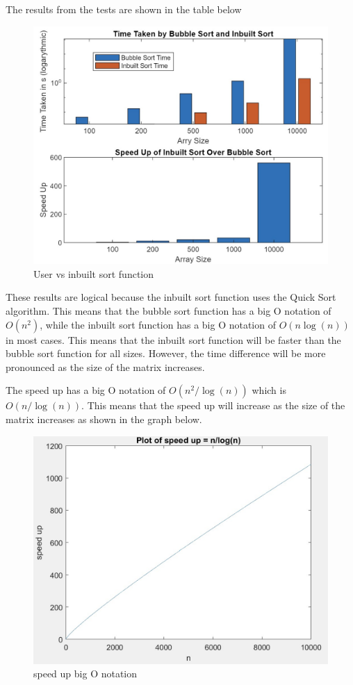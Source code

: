 The results from the tests are shown in the table below


\begin{figure}[H]
 \centering
 \includegraphics[width=0.6\columnwidth]{Figures/noPar}
 \caption{User vs inbuilt sort function}
 \label{fig:noPar}
\end{figure}

These results are logical because the inbuilt sort function uses the Quick Sort algorithm. 
This means that the bubble sort function has a big O notation of $O(n^2)$, while the inbuilt sort function has a big O notation of $O(n\log(n))$ in most cases.
This means that the inbuilt sort function will be faster than the bubble sort function for all sizes.
However, the time difference will be more pronounced as the size of the matrix increases.

The speed up has a big O notation of $O(n^2/\log(n))$ which is $O(n/\log(n))$.
This means that the speed up will increase as the size of the matrix increases as shown in the graph below.


\begin{figure}[H]
    \centering
    \includegraphics[width=0.6\columnwidth]{Figures/speed_up_big n notation}
    \caption{speed up big O notation}
    \label{fig:noPar}
\end{figure}

